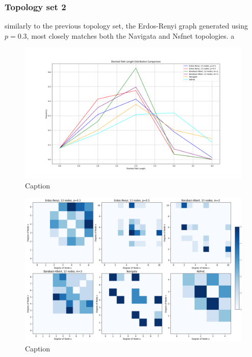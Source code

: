 \subsubsection{Topology set 2}
similarly to the previous topology set, the Erdos-Renyi graph generated using $p=0.3$, most closely matches both the Navigata and Nsfnet topologies. a
\begin{figure}
    \centering
    \includegraphics[width=0.9\linewidth]{images/FINAL-TOPO-COMP/line-13.png}
    \caption{Caption}
    \label{fig:enter-label}
\end{figure}

\begin{figure}
    \centering
    \includegraphics[width=0.9\linewidth]{images/FINAL-TOPO-COMP/Degree-correlation-matrices/13-matrix.png}
    \caption{Caption}
    \label{fig:enter-label}
\end{figure}

